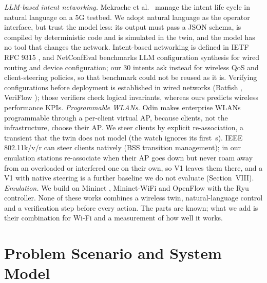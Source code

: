 \documentclass[conference]{IEEEtran}
\begin{document}
\emph{LLM-based intent networking.} Mekrache et al.\ \cite{mekrache2024} manage the intent life cycle in natural language on a 5G testbed. We adopt natural language as the operator interface, but trust the model less: its output must pass a JSON schema, is compiled by deterministic code and is simulated in the twin, and the model has no tool that changes the network. Intent-based networking is defined in IETF RFC 9315 \cite{clemm2022}, and NetConfEval \cite{wang2024} benchmarks LLM configuration synthesis for wired routing and device configuration; our 30 intents ask instead for wireless QoS and client-steering policies, so that benchmark could not be reused as it is. Verifying configurations before deployment is established in wired networks (Batfish \cite{fogel2015}, VeriFlow \cite{khurshid2013}); those verifiers check logical invariants, whereas ours predicts wireless performance KPIs.
\emph{Programmable WLANs.} Odin \cite{suresh2012} makes enterprise WLANs programmable through a per-client virtual AP, because clients, not the infrastructure, choose their AP. We steer clients by explicit re-association, a transient that the twin does not model (the watch ignores its first \CfgSettle\,s). IEEE 802.11k/v/r \cite{ieee80211} can steer clients natively (BSS transition management); in our emulation stations re-associate when their AP goes down but never roam away from an overloaded or interfered one on their own, so V1 leaves them there, and a V1 with native steering is a further baseline we do not evaluate (Section~VIII).
\emph{Emulation.} We build on Mininet \cite{lantz2010}, Mininet-WiFi \cite{fontes2015} and OpenFlow \cite{mckeown2008} with the Ryu controller.
None of these works combines a wireless twin, natural-language control and a verification step before every action. The parts are known; what we add is their combination for Wi-Fi and a measurement of how well it works.

\section{Problem Scenario and System Model}
\end{document}
